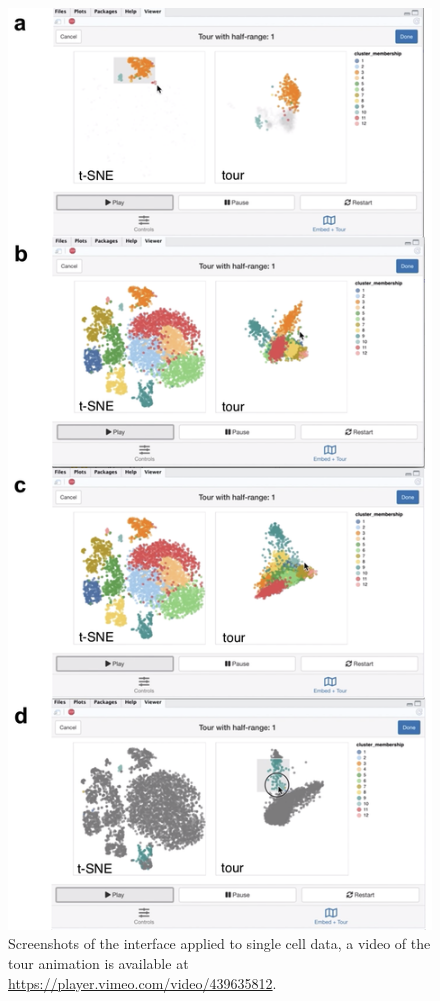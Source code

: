 \documentclass[article,notitle]{jdssv}
\begin{document}
\begin{figure}
{\centering \includegraphics[width=\textwidth,height=0.9\textheight]{img/liminal-screenshot-mouse-01} 

}

\caption{Screenshots of the  interface applied to single cell data, a video of the tour animation is available at \url{https://player.vimeo.com/video/439635812}.}\label{fig:mouse-01}
\end{figure}
\end{document}
